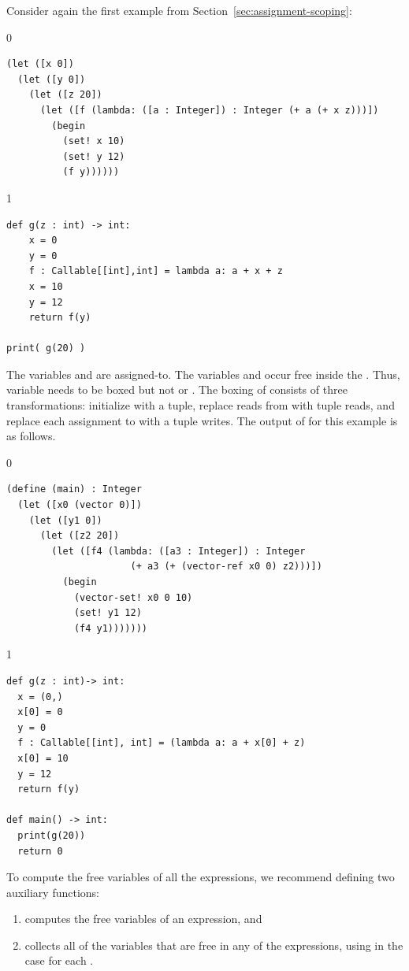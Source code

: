 \documentclass[7x10,nocrop]{TimesAPriori_MIT}%
\def\racketEd{0}
\def\pythonEd{1}
\def\edition{1}
\begin{document}
Consider again the first example from
Section~\ref{sec:assignment-scoping}:
%
{\if\edition\racketEd
\begin{lstlisting}
(let ([x 0])
  (let ([y 0])
    (let ([z 20])
      (let ([f (lambda: ([a : Integer]) : Integer (+ a (+ x z)))])
        (begin
          (set! x 10)
          (set! y 12)
          (f y))))))
\end{lstlisting}
\fi}
{\if\edition\pythonEd
\begin{lstlisting}
def g(z : int) -> int:
    x = 0
    y = 0  
    f : Callable[[int],int] = lambda a: a + x + z
    x = 10
    y = 12
    return f(y)

print( g(20) )
\end{lstlisting}
\fi}
%
\noindent The variables  and  are assigned-to.  The
variables  and  occur free inside the
. Thus, variable  needs to be boxed but not
 or .  The boxing of  consists of three
transformations: initialize  with a tuple, replace reads from
 with tuple reads, and replace each assignment to 
with a tuple writes. The output of  for
this example is as follows.
%
{\if\edition\racketEd
\begin{lstlisting}
(define (main) : Integer
  (let ([x0 (vector 0)])
    (let ([y1 0])
      (let ([z2 20])
        (let ([f4 (lambda: ([a3 : Integer]) : Integer
                      (+ a3 (+ (vector-ref x0 0) z2)))])
          (begin 
            (vector-set! x0 0 10)
            (set! y1 12)
            (f4 y1)))))))
\end{lstlisting}
\fi}
%
{\if\edition\pythonEd
\begin{lstlisting}
def g(z : int)-> int:
  x = (0,)
  x[0] = 0
  y = 0
  f : Callable[[int], int] = (lambda a: a + x[0] + z)
  x[0] = 10
  y = 12
  return f(y)

def main() -> int:
  print(g(20))
  return 0
\end{lstlisting}
\fi}

To compute the free variables of all the  expressions, we
recommend defining two auxiliary functions:
\begin{enumerate}
\item {} computes the free variables of an expression, and
\item {} collects all of the variables that are
  free in any of the  expressions, using
   in the case for each .
\end{enumerate}
\end{document}
